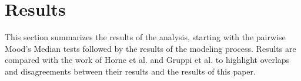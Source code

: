 \documentclass[../thesis.tex]{subfiles}
\begin{document}
\chapter{Results}
\label{ch:results}

This section summarizes the results of the analysis, starting with the pairwise Mood's Median tests followed by the results of the modeling process. Results are compared with the work of Horne et al. and Gruppi et al. to highlight overlaps and disagreements between their results and the results of this paper.
\end{document}
